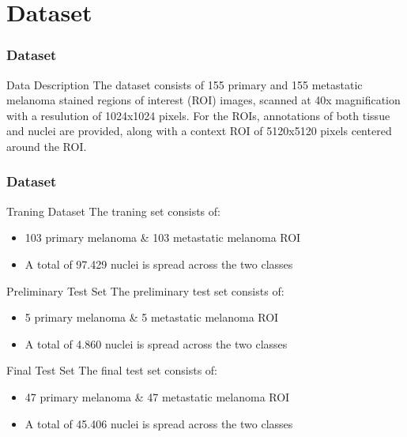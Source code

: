 \documentclass[../main.tex]{subfiles}
\begin{document}
\section{Dataset}
\begin{frame}[t]
    \frametitle{Dataset}

    \begin{block}{Data Description}
        The dataset consists of 155 primary and 155 metastatic 
        melanoma stained regions of interest (ROI) images, scanned at 40x 
        magnification with a resulution of 1024x1024 pixels.
        For the ROIs, annotations of both tissue and 
        nuclei are provided, along with a context ROI 
        of 5120x5120 pixels centered around the ROI.
    \end{block}

\end{frame}

\begin{frame}[t]
    \frametitle{Dataset}

    \begin{block}{Traning Dataset}
        \small
        The traning set consists of:
        \begin{itemize}
            \item 103 primary melanoma \& 103 metastatic melanoma ROI
            \item A total of 97.429 nuclei is spread across the two 
            classes
        \end{itemize}
    \end{block}

    \begin{block}{Preliminary Test Set }
        \small
        The preliminary test set consists of:
        \begin{itemize}
            \item 5 primary melanoma \& 5 metastatic melanoma ROI
            \item A total of 4.860 nuclei is spread across the two 
            classes
        \end{itemize}
    \end{block}

    \begin{block}{Final Test Set}
        \small 
        The final test set consists of:
        \begin{itemize}
            \item 47 primary melanoma \& 47 metastatic melanoma ROI
            \item A total of 45.406 nuclei is spread across the two 
            classes
        \end{itemize}
    \end{block}
\end{frame}
\end{document}
